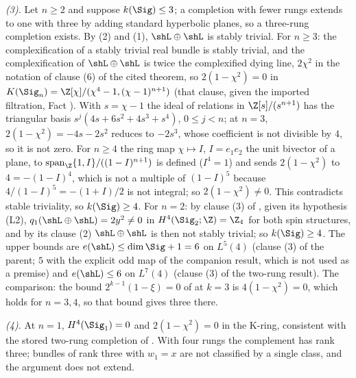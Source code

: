 \emph{(3).} Let $n \geq 2$ and suppose $k(\Sig) \leq 3$; a completion with fewer rungs extends to one with three by adding standard hyperbolic planes, so a three-rung completion exists. By (2) and (1), $\shL \oplus \shL$ is stably trivial. For $n \geq 3$: the complexification of a stably trivial real bundle is stably trivial, and the complexification of $\shL \oplus \shL$ is twice the complexified dying line, $2\chi^{2}$ in the notation of clause (6) of the cited theorem, so $2(1 - \chi^{2}) = 0$ in $K(\Sig_{n}) = \Z[\chi]/(\chi^{4} - 1, (\chi - 1)^{n+1})$ (that clause, given the imported filtration, Fact ). With $s = \chi - 1$ the ideal of relations in $\Z[s]/(s^{n+1})$ has the triangular basis $s^{j}(4s + 6s^{2} + 4s^{3} + s^{4})$, $0 \leq j < n$; at $n = 3$, $2(1 - \chi^{2}) = -4s - 2s^{2}$ reduces to $-2s^{3}$, whose coefficient is not divisible by $4$, so it is not zero. For $n \geq 4$ the ring map $\chi \mapsto I$, $I = e_{1}e_{2}$ the unit bivector of a plane, to $\mathrm{span}_{\Z}\{1, I\}/((1 - I)^{n+1})$ is defined ($I^{4} = 1$) and sends $2(1 - \chi^{2})$ to $4 = -(1 - I)^{4}$, which is not a multiple of $(1 - I)^{5}$ because $4/(1 - I)^{5} = -(1 + I)/2$ is not integral; so $2(1 - \chi^{2}) \neq 0$. This contradicts stable triviality, so $k(\Sig) \geq 4$. For $n = 2$: by clause (3) of , given its hypothesis (L2), $q_{1}(\shL \oplus \shL) = 2y^{2} \neq 0$ in $H^{4}(\Sig_{2}; \Z) = \Z_{4}$ for both spin structures, and by its clause (2) $\shL \oplus \shL$ is then not stably trivial; so $k(\Sig) \geq 4$. The upper bounds are $e(\shL) \leq \dim\Sig + 1 = 6$ on $L^{5}(4)$ (clause (3) of the parent; $5$ with the explicit odd map of the companion result, which is not used as a premise) and $e(\shL) \leq 6$ on $L^{7}(4)$ (clause (3) of the two-rung result). The comparison: the bound $2^{k-1}(1 - \xi) = 0$ of  at $k = 3$ is $4(1 - \chi^{2}) = 0$, which holds for $n = 3, 4$, so that bound gives three there.

\emph{(4).} At $n = 1$, $H^{4}(\Sig_{1}) = 0$ and $2(1 - \chi^{2}) = 0$ in the K-ring, consistent with the stored two-rung completion of . With four rungs the complement has rank three; bundles of rank three with $w_{1} = x$ are not classified by a single class, and the argument does not extend.
